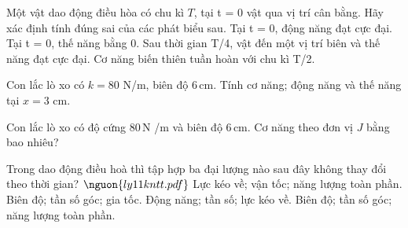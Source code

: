 \begin{ex}
Một vật dao động điều hòa có chu kì $T$, tại t = 0 vật qua vị trí cân bằng. Hãy xác định tính đúng sai của các phát biểu sau.
\choiceTF
{\True Tại t = 0, động năng đạt cực đại.}
{\True Tại t = 0, thế năng bằng 0.}
{\True Sau thời gian T/4, vật đến một vị trí biên và thế năng đạt cực đại.}
{Cơ năng biến thiên tuần hoàn với chu kì T/2.}
\end{ex}

\begin{bt}
Con lắc lò xo có $k=80$ N/m, biên độ $6\,\text{cm}$. Tính cơ năng; động năng và thế năng tại $x=3$ cm.
\end{bt}

\begin{ex}
Con lắc lò xo có độ cứng $80\,\text{N}$ /m và biên độ $6\,\text{cm}$. Cơ năng theo đơn vị $J$ bằng bao nhiêu?
\end{ex}

\begin{ex}
Trong dao động điều hoà thì tập hợp ba đại lượng nào sau đây không thay đổi theo thời gian? $\nguon{ly11 kntt.pdf}$
\choice
{Lực kéo về; vận tốc; năng lượng toàn phần.}
{Biên độ; tần số góc; gia tốc.}
{Động năng; tần số; lực kéo về.}
{\True Biên độ; tần số góc; năng lượng toàn phần.}
\end{ex}

